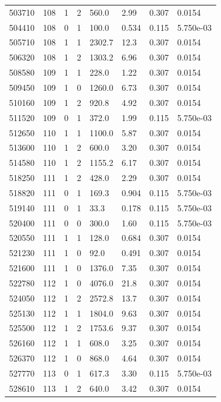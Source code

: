 \documentclass[preview]{standalone}
\begin{document}
{{{{{{{{{{{{{\begin{tabular}{L{1.2cm}C{1.2cm} C{0.3cm}C{0.5cm} C{1.4cm}C{1.4cm} C{1.4cm}C{1.4cm}}
  503710  &   108  & 1     &  2 &  560.0  & 2.99  & 0.307 &  0.0154   \\ 
  504410  &   108  & 0     &  1 &  100.0  & 0.534  & 0.115 &  5.750e-03   \\ 
  505710  &   108  & 1     &  1 &  2302.7  & 12.3  & 0.307 &  0.0154   \\ 
  506320  &   108  & 1     &  2 &  1303.2  & 6.96  & 0.307 &  0.0154   \\ 
  508580  &   109  & 1     &  1 &  228.0  & 1.22  & 0.307 &  0.0154   \\ 
  509450  &   109  & 1     &  0 &  1260.0  & 6.73  & 0.307 &  0.0154   \\ 
  510160  &   109  & 1     &  2 &  920.8  & 4.92  & 0.307 &  0.0154   \\ 
  511520  &   109  & 0     &  1 &  372.0  & 1.99  & 0.115 &  5.750e-03   \\ 
  512650  &   110  & 1     &  1 &  1100.0  & 5.87  & 0.307 &  0.0154   \\ 
  513600  &   110  & 1     &  2 &  600.0  & 3.20  & 0.307 &  0.0154   \\ 
  514580  &   110  & 1     &  2 &  1155.2  & 6.17  & 0.307 &  0.0154   \\ 
  518250  &   111  & 1     &  2 &  428.0  & 2.29  & 0.307 &  0.0154   \\ 
  518820  &   111  & 0     &  1 &  169.3  & 0.904  & 0.115 &  5.750e-03   \\ 
  519140  &   111  & 0     &  1 &  33.3  & 0.178  & 0.115 &  5.750e-03   \\ 
  520400  &   111  & 0     &  0 &  300.0  & 1.60  & 0.115 &  5.750e-03   \\ 
  520550  &   111  & 1     &  1 &  128.0  & 0.684  & 0.307 &  0.0154   \\ 
  521230  &   111  & 1     &  0 &  92.0  & 0.491  & 0.307 &  0.0154   \\ 
  521600  &   111  & 1     &  0 &  1376.0  & 7.35  & 0.307 &  0.0154   \\ 
  522780  &   112  & 1     &  0 &  4076.0  & 21.8  & 0.307 &  0.0154   \\ 
  524050  &   112  & 1     &  2 &  2572.8  & 13.7  & 0.307 &  0.0154   \\ 
  525130  &   112  & 1     &  1 &  1804.0  & 9.63  & 0.307 &  0.0154   \\ 
  525500  &   112  & 1     &  2 &  1753.6  & 9.37  & 0.307 &  0.0154   \\ 
  526160  &   112  & 1     &  1 &  608.0  & 3.25  & 0.307 &  0.0154   \\ 
  526370  &   112  & 1     &  0 &  868.0  & 4.64  & 0.307 &  0.0154   \\ 
  527770  &   113  & 0     &  1 &  617.3  & 3.30  & 0.115 &  5.750e-03   \\ 
  528610  &   113  & 1     &  2 &  640.0  & 3.42  & 0.307 &  0.0154   \\ 
\hline 
\end{tabular} 

}}}}}}}}}}}}}
\end{document}

